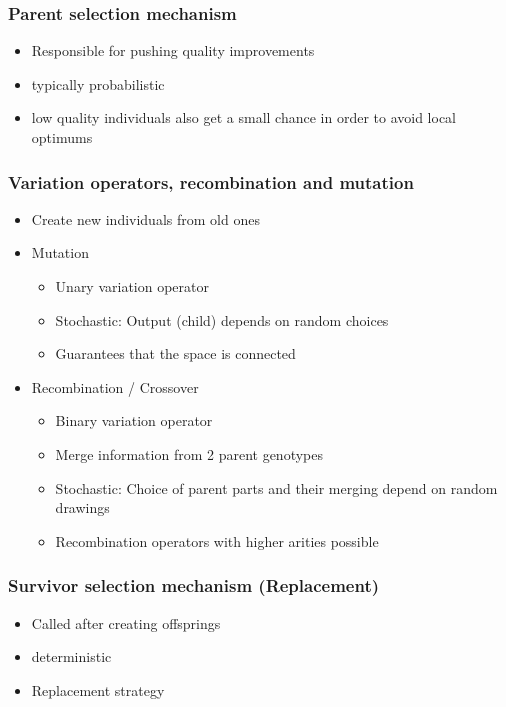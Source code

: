 \subsubsection{Parent selection mechanism}
    \begin{itemize}
        \item Responsible for pushing quality improvements
        \item typically probabilistic
        \item low quality individuals also get a small chance in order to avoid local optimums
    \end{itemize}
\subsubsection{Variation operators, recombination and mutation}
    \begin{itemize}
        \item Create new individuals from old ones
        \item Mutation
        \begin{itemize}
            \item Unary variation operator
            \item Stochastic: Output (child) depends on random choices
            \item Guarantees that the space is connected
        \end{itemize}
        \item Recombination / Crossover
        \begin{itemize}
            \item Binary variation operator
            \item Merge information from 2 parent genotypes
            \item Stochastic: Choice of parent parts and their merging depend on random drawings
            \item Recombination operators with higher arities possible
        \end{itemize}
    \end{itemize}
\subsubsection{Survivor selection mechanism (Replacement)}
    \begin{itemize}
        \item Called after creating offsprings
        \item deterministic
        \item Replacement strategy
    \end{itemize}
